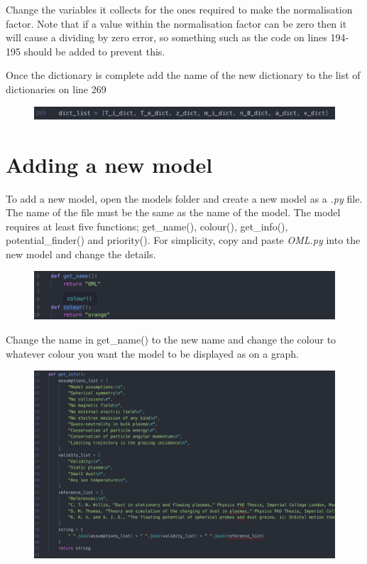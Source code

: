 \documentclass{journal}
\begin{document}
Change the variables it collects for the ones required to make the 
normalisation factor. Note that if a value within the normalisation factor 
can be zero then it will cause a dividing by zero error, so something such as 
the code on lines 194-195 should be added to prevent this.

\newpage

Once the dictionary is complete add the name of the new dictionary to the list of dictionaries on line 269

\begin{figure}[H]
\centering
\includegraphics[width=\linewidth]{Output/code3.jpeg}
\label{code3} 
\end{figure}

\section{Adding a new model}

To add a new model, open the models folder and create a 
new model as a \textit{.py} file. The name of the file must be 
the same as the name of the model. The model requires at 
least five functions; get\_name(), colour(), get\_info(), 
potential\_finder() and priority(). For simplicity, 
copy and paste \textit{OML.py} into the new model and 
change the details. 

\begin{figure}[H]
\centering
\includegraphics[width=\linewidth]{Output/code4.jpeg}
\label{code4} 
\end{figure}

Change the name in get\_name() to the new name and 
change the colour to whatever colour you want the 
model to be displayed as on a graph.

\begin{figure}[H]
\centering
\includegraphics[width=\linewidth]{Output/code5.jpeg}
\label{code5} 
\end{figure}
\end{document}

